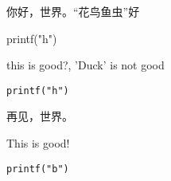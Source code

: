 \documentclass[a4paper,12pt]{article}
\begin{document}
你好，世界。“花鸟鱼虫”好

printf("h")

this is good?, 'Duck' is not good

\verb|printf("h")|

\newpage

再见，世界。

This is good!

\verb|printf("b")|

\label{LastPage}
\end{document}
